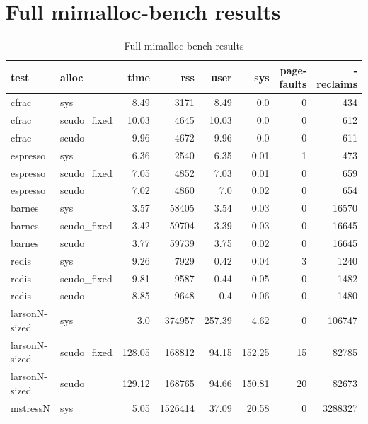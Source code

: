 \documentclass[a4paper,11pt,oneside]{report}
\begin{document}
\cleardoublepage{}
\printbibliography{}

\appendix
\chapter{Full mimalloc-bench results}

\begin{longtable}[h]{l l r r r r r r}
  \caption{Full mimalloc-bench results}\label{tab:FullMimallocBench} \\

  \toprule
  test & alloc & time & rss & user & sys & page-faults & -reclaims \\
  \midrule
  \endhead{}
  cfrac & sys & 8.49 & 3171 & 8.49 & 0.0 & 0 & 434 \\
  \midrule
  cfrac & scudo\_fixed & 10.03 & 4645 & 10.03 & 0.0 & 0 & 612 \\
  \midrule
  cfrac & scudo & 9.96 & 4672 & 9.96 & 0.0 & 0 & 611 \\
  \midrule
  espresso & sys & 6.36 & 2540 & 6.35 & 0.01 & 1 & 473 \\
  \midrule
  espresso & scudo\_fixed & 7.05 & 4852 & 7.03 & 0.01 & 0 & 659 \\
  \midrule
  espresso & scudo & 7.02 & 4860 & 7.0 & 0.02 & 0 & 654 \\
  \midrule
  barnes & sys & 3.57 & 58405 & 3.54 & 0.03 & 0 & 16570 \\
  \midrule
  barnes & scudo\_fixed & 3.42 & 59704 & 3.39 & 0.03 & 0 & 16645 \\
  \midrule
  barnes & scudo & 3.77 & 59739 & 3.75 & 0.02 & 0 & 16645 \\
  \midrule
  redis & sys & 9.26 & 7929 & 0.42 & 0.04 & 3 & 1240 \\
  \midrule
  redis & scudo\_fixed & 9.81 & 9587 & 0.44 & 0.05 & 0 & 1482 \\
  \midrule
  redis & scudo & 8.85 & 9648 & 0.4 & 0.06 & 0 & 1480 \\
  \midrule
  larsonN-sized & sys & 3.0 & 374957 & 257.39 & 4.62 & 0 & 106747 \\
  \midrule
  larsonN-sized & scudo\_fixed & 128.05 & 168812 & 94.15 & 152.25 & 15 & 82785 \\
  \midrule
  larsonN-sized & scudo & 129.12 & 168765 & 94.66 & 150.81 & 20 & 82673 \\
  \midrule
  mstressN & sys & 5.05 & 1526414 & 37.09 & 20.58 & 0 & 3288327 \\

\end{longtable}
\end{document}
